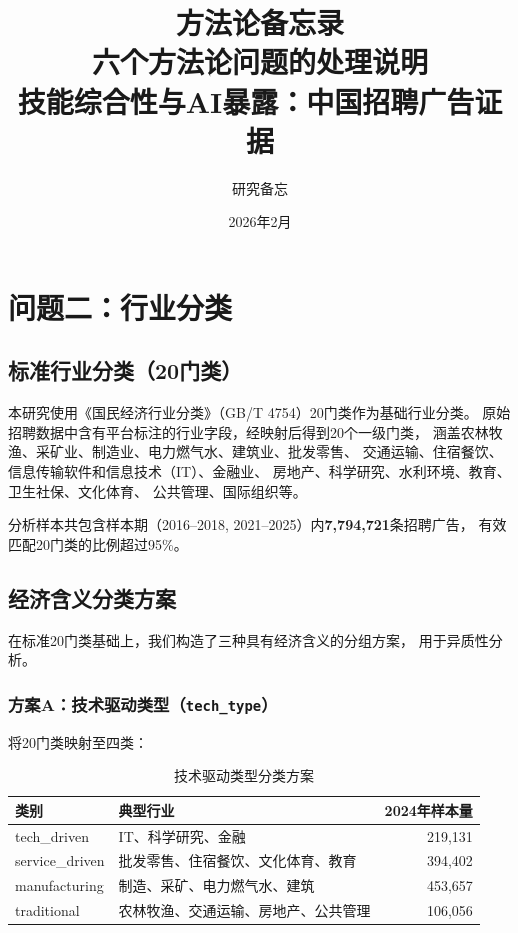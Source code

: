 \documentclass[12pt,a4paper]{ctexart}
\title{\textbf{方法论备忘录}\\
\large 六个方法论问题的处理说明\\[0.5em]
\normalsize 技能综合性与AI暴露：中国招聘广告证据}
\author{研究备忘}
\date{2026年2月}
\begin{document}
\maketitle
\tableofcontents
\newpage

\section{问题二：行业分类}
\label{sec:industry}

\subsection{标准行业分类（20门类）}

本研究使用《国民经济行业分类》（GB/T 4754）20门类作为基础行业分类。
原始招聘数据中含有平台标注的行业字段，经映射后得到20个一级门类，
涵盖农林牧渔、采矿业、制造业、电力燃气水、建筑业、批发零售、
交通运输、住宿餐饮、信息传输软件和信息技术（IT）、金融业、
房地产、科学研究、水利环境、教育、卫生社保、文化体育、
公共管理、国际组织等。

分析样本共包含样本期（2016--2018, 2021--2025）内\textbf{7,794,721}条招聘广告，
有效匹配20门类的比例超过95\%。

\subsection{经济含义分类方案}

在标准20门类基础上，我们构造了三种具有经济含义的分组方案，
用于异质性分析。

\subsubsection{方案A：技术驱动类型（\texttt{tech\_type}）}

将20门类映射至四类：

\begin{table}[h!]
\centering
\caption{技术驱动类型分类方案}
\label{tab:tech_type}
\begin{tabular}{llr}
\toprule
类别 & 典型行业 & 2024年样本量 \\
\midrule
tech\_driven & IT、科学研究、金融 & 219,131 \\
service\_driven & 批发零售、住宿餐饮、文化体育、教育 & 394,402 \\
manufacturing & 制造、采矿、电力燃气水、建筑 & 453,657 \\
traditional & 农林牧渔、交通运输、房地产、公共管理 & 106,056 \\
\bottomrule
\end{tabular}
\end{table}
\end{document}
